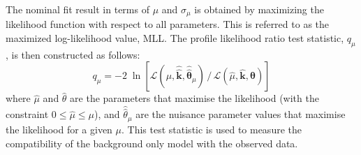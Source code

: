 The nominal fit result in terms of $\mu$ and $\sigma_{\mu}$ is obtained by
maximizing the likelihood function with respect to all parameters.  This is
referred to as the maximized log-likelihood value, MLL. The profile likelihood
ratio test statistic, $q_\mu$, is then constructed as follows:
\begin{equation}
  q_\mu = - 2\; \ln \left[ \mathcal{L} (\mu, \hat{\hat{\mathbf{k}}},
    \hat{\hat{\bm\theta}}_{\mu})\, / \, \mathcal{L} (\hat{\mu},
    \hat{\mathbf{k}}, \hat{\bm\theta}) \right]
\end{equation}
where $\hat{\mu}$ and $\hat{\theta}$ are the parameters that maximise the
likelihood (with the constraint $0 \leq \hat{\mu} \leq \mu$), and
$\hat{\hat{\theta}}_\mu$ are the nuisance parameter values that maximise the
likelihood for a given $\mu$. This test statistic is used to measure the
compatibility of the background only model with the observed data.





